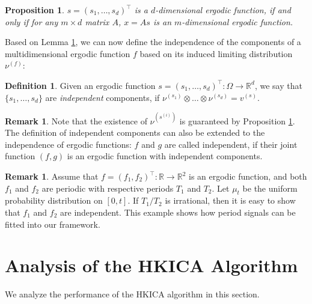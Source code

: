 \documentclass[twoside]{article}
\newcommand{\scom}[1]{s_{#1}}
\newcommand{\real}{\mathbb{R}}
\newtheorem{prop}[lemma]{Proposition}
\theoremstyle{definition}
\newtheorem{definition}[lemma]{Definition}
\newtheorem{remark}[lemma]{Remark}
\begin{document}
\begin{prop}\label{prop:comp}
$s = (\scom{1},\ldots,\scom{d})^{\top}$ is a $d$-dimensional ergodic function, if and only if 
 for any $m\times d$ matrix $A$, $x = A s$ is an $m$-dimensional ergodic function.
\end{prop}  
Based on Lemma \ref{prop:comp}, we can now define the independence of the components of a multidimensional ergodic function $f$ based on its induced limiting distribution $\nu^{(f)}$:
\begin{definition}
Given an ergodic function $s = (\scom{1},\ldots, \scom{d})^{\top}:\Omega \rightarrow \real^d$, 
we say that $\{\scom{1},\ldots, \scom{d}\}$ are \emph{independent} components, 
	if $\nu^{(\scom{1})}\otimes\ldots\otimes\nu^{(\scom{d})} = v^{(s)}$.
\end{definition}
\begin{remark}
Note that the existence of $\nu^{(s^{(i)})}$ is guaranteed by Proposition \ref{prop:comp}. 
The definition of independent components can also be extended to the independence of ergodic functions: 
$f$ and $g$ are called independent, if their joint function $(f,g)$ is an ergodic function with independent components. 
\end{remark}
\begin{remark}
Assume that $f = (f_1,f_2)^{\top}:\real\rightarrow\real^2$ is an ergodic function, and both $f_1$ and $f_2$ are periodic with respective periods $T_1$ and $T_2$. 
Let $\mu_t$ be the uniform probability distribution on $[0,t]$. 
 If $T_1/T_2$ is irrational, then it is easy to show that $f_1$ and $f_2$ are independent. 
 This example shows how period signals can be fitted into our framework.
\end{remark}
\fi

\section{Analysis of the HKICA Algorithm}
\label{sec:AnalysisHK}
We analyze the performance of the HKICA algorithm in this section.
\end{document}
